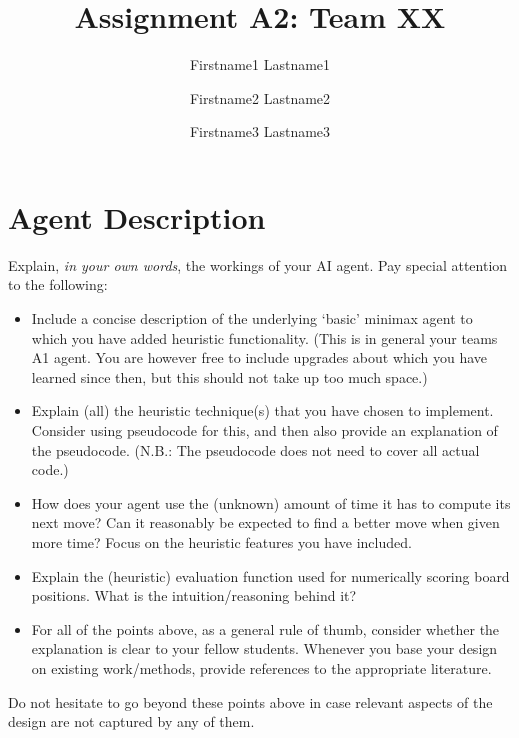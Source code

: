 \documentclass[11pt]{article}
\title{Assignment A2: Team XX}
\author{Firstname1 Lastname1 \and Firstname2 Lastname2 \and Firstname3 Lastname3}
\date{}
\begin{document}
\maketitle


\section{Agent Description}\label{sec:description}
Explain, \emph{in your own words}, the workings of your AI agent.
Pay special attention to the following:
\begin{itemize}
	\item Include a concise description of the underlying ‘basic’ minimax agent to which you have added heuristic functionality.
	(This is in general your teams A1 agent.
	You are however free to include upgrades about which you have learned since then, but this should not take up too much space.)
	\item Explain (all) the heuristic technique(s) that you have chosen to implement.
	Consider using pseudocode for this, and then also provide an explanation of the pseudocode.
	(N.B.: The pseudocode does not need to cover all actual code.)
	\item How does your agent use the (unknown) amount of time it has to compute its next move? Can it reasonably be expected to find a better move when given more time? Focus on the heuristic features you have included.
	\item Explain the (heuristic) evaluation function used for numerically scoring board positions.
	What is the intuition/reasoning behind it?
	\item For all of the points above, as a general rule of thumb, consider whether the explanation is clear to your fellow students. Whenever you base your design on existing work/methods, provide references to the appropriate literature.
\end{itemize}
Do not hesitate to go beyond these points above in case relevant aspects of the design are not captured by any of them.
\end{document}
